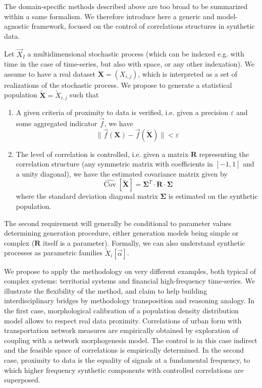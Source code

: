 \documentclass{bmcart}
\DeclareMathOperator{\Cov}{Cov}
\newcommand{\norm}[1]{\| #1 \|}
\begin{document}
The domain-specific methods described above are too broad to be summarized within a same formalism. We therefore introduce here a generic and model-agnostic framework, focused on the control of correlations structures in synthetic data.

Let $\vec{X}_I$ a multidimensional stochastic process (which can be indexed e.g. with time in the case of time-series, but also with space, or any other indexation). We assume to have a real dataset $\mathbf{X}=(X_{i,j})$, which is interpreted as a set of realizations of the stochastic process. We propose to generate a statistical population $\mathbf{\tilde{X}}=\tilde{X}_{i,j}$ such that
\begin{enumerate}
\item A given criteria of proximity to data is verified, i.e. given a precision $\varepsilon$ and some aggregated indicator $\vec{f}$, we have 
\begin{equation}
\label{eq:data-proximity}
\norm{\vec{f}(\mathbf{X})- \vec{f}(\mathbf{\tilde{X}})} < \varepsilon
\end{equation}
\item The level of correlation is controlled, i.e. given a matrix $\mathbf{R}$ representing the correlation structure (any symmetric matrix with coefficients in $[-1,1]$ and a unity diagonal), we have the estimated covariance matrix given by
\begin{equation}
\hat{\Cov{}{}}\left[\mathbf{\tilde{X}}\right] = \mathbf{\Sigma}^{T} \cdot \mathbf{R} \cdot \mathbf{\Sigma}
\end{equation}
where the standard deviation diagonal matrix $\mathbf{\Sigma}$ is estimated on the synthetic population.
\end{enumerate}


The second requirement will generally be conditional to parameter values determining generation procedure, either generation models being simple or complex ($\mathbf{R}$ itself is a parameter). Formally,  we can also understand synthetic processes as parametric families $\tilde{X}_i[\vec{\alpha}]$.

We propose to apply the methodology on very different examples, both typical of complex systems: territorial systems and financial high-frequency time-series. We illustrate the flexibility of the method, and claim to help building interdisciplinary bridges by methodology transposition and reasoning analogy. In the first case, morphological calibration of a population density distribution model allows to respect real data proximity. Correlations of urban form with transportation network measures are empirically obtained by exploration of coupling with a network morphogenesis model. The control is in this case indirect and the feasible space of correlations is empirically determined. In the second case, proximity to data is the equality of signals at a fundamental frequency, to which higher frequency synthetic components with controlled correlations are superposed.
\end{document}
